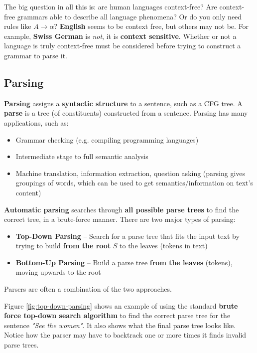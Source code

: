 \documentclass{article}
\begin{document}
The big question in all this is: are human languages context-free? Are context-free grammars able to describe all language phenomena? Or do you only need rules like $A \rightarrow \alpha$? \textbf{English} seems to be context free, but others may not be. For example, \textbf{Swiss German} is \textit{not}, it is \textbf{context sensitive}. Whether or not a language is truly context-free must be considered before trying to construct a grammar to parse it.

\subsection{Parsing}

\textbf{Parsing} assigns a \textbf{syntactic structure} to a sentence, such as a CFG tree. A \textbf{parse} is a tree (of constituents) constructed from a sentence. Parsing has many applications, such as:
\begin{itemize}
	\item Grammar checking (e.g. compiling programming languages)
	\item Intermediate stage to full semantic analysis
	\item Machine translation, information extraction, question asking (parsing gives groupings of words, which can be used to get semantics/information on text's content)
\end{itemize}

\textbf{Automatic parsing} searches through \textbf{all possible parse trees} to find the correct tree, in a brute-force manner. There are two major types of parsing:
\begin{itemize}
	\item \textbf{Top-Down Parsing} -- Search for a parse tree that fits the input text by trying to build \textbf{from the root} $S$ to the leaves (tokens in text)
	\item \textbf{Bottom-Up Parsing} -- Build a parse tree \textbf{from the leaves} (tokens), moving upwards to the root
\end{itemize}
Parsers are often a combination of the two approaches.

Figure \ref{fig:top-down-parsing} shows an example of using the standard \textbf{brute force top-down search algorithm} to find the correct parse tree for the sentence \textit{"See the women"}. It also shows what the final parse tree looks like. Notice how the parser may have to backtrack one or more times it finds invalid parse trees.
\end{document}
